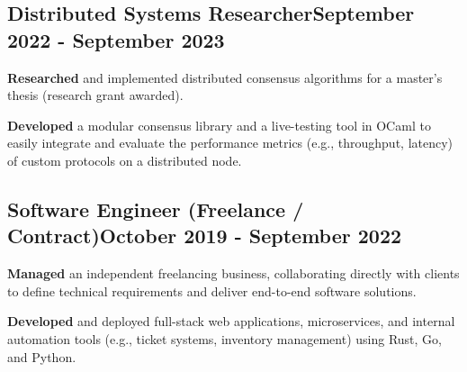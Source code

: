 \documentclass[a4paper,12pt]{article}
\begin{document}
\vspace*{1pt} 
\subsection{{Distributed Systems Researcher}\hfill September 2022 - September 2023}
\begin{zitemize}
    \item \textbf{Researched} and implemented distributed consensus algorithms for a master's thesis (research grant awarded).
    \item \textbf{Developed} a modular consensus library and a live-testing tool in OCaml to easily integrate and evaluate the performance metrics (e.g., throughput, latency) of custom protocols on a distributed node.
\end{zitemize}

\vspace*{1pt} 
\subsection{{Software Engineer (Freelance / Contract)}\hfill October 2019 - September 2022}
\begin{zitemize}
  \item \textbf{Managed} an independent freelancing business, collaborating directly with clients to define technical requirements and deliver end-to-end software solutions.
  \item \textbf{Developed} and deployed full-stack web applications, microservices, and internal automation tools (e.g., ticket systems, inventory management) using Rust, Go, and Python.
\end{zitemize}
\end{document}
